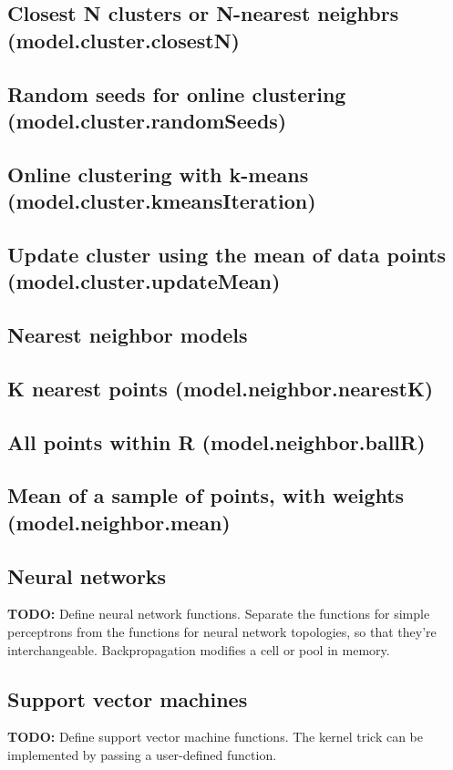 \documentclass{article}
\theoremstyle{definition}
\begin{document}
\subsection{Closest N clusters or N-nearest neighbrs (model.cluster.closestN)}

\subsection{Random seeds for online clustering (model.cluster.randomSeeds)}

\subsection{Online clustering with k-means (model.cluster.kmeansIteration)}

\subsection{Update cluster using the mean of data points (model.cluster.updateMean)}

\subsection{Nearest neighbor models}

\subsection{K nearest points (model.neighbor.nearestK)}

\subsection{All points within R (model.neighbor.ballR)}

\subsection{Mean of a sample of points, with weights (model.neighbor.mean)}

\subsection{Neural networks}

{\bf TODO:} Define neural network functions.  Separate the functions for simple perceptrons from the functions for neural network topologies, so that they're interchangeable.  Backpropagation modifies a cell or pool in memory.

\subsection{Support vector machines}

{\bf TODO:} Define support vector machine functions.  The kernel trick can be implemented by passing a user-defined function.
\end{document}
